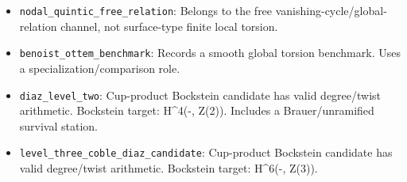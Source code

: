 \begin{itemize}
\item \texttt{nodal\_\allowbreak{}quintic\_\allowbreak{}free\_\allowbreak{}relation}: Belongs to the free vanishing-cycle/global-relation channel, not surface-type finite local torsion.
\item \texttt{benoist\_\allowbreak{}ottem\_\allowbreak{}benchmark}: Records a smooth global torsion benchmark. Uses a specialization/comparison role.
\item \texttt{diaz\_\allowbreak{}level\_\allowbreak{}two}: Cup-product Bockstein candidate has valid degree/twist arithmetic. Bockstein target: H\textasciicircum{}4(-, Z(2)). Includes a Brauer/unramified survival station.
\item \texttt{level\_\allowbreak{}three\_\allowbreak{}coble\_\allowbreak{}diaz\_\allowbreak{}candidate}: Cup-product Bockstein candidate has valid degree/twist arithmetic. Bockstein target: H\textasciicircum{}6(-, Z(3)).
\end{itemize}
